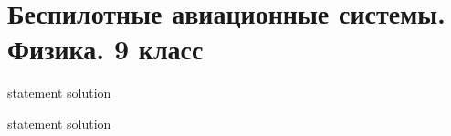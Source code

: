 \chapter{Беспилотные авиационные системы. Физика. 9 класс}

{statement}
{solution}

{statement}
{solution}